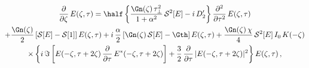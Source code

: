 \begin{multline} \label{eqn:mflt_ezt_pde}
    \frac{\partial}{\partial \zeta}\, E(\zeta, \tau) = \half \left\{ \frac{\Gn(\zeta)\, \tau_\perp^2}{1 + \alpha^2}\, \mathcal{S}^2[E] - i\, D_2^\prime \right\} \frac{\partial^2}{\partial \tau^2}\, E(\zeta, \tau) \\
    + \frac{\Gn(\zeta)}{2} \left[ \mathcal{S}[E] - \mathcal{S}[1]\right] E(\zeta, \tau)
    + i\, \frac{\alpha}{2} \left[ \Gn(\zeta)\, \mathcal{S}[E] - \Gth \right] E(\zeta, \tau) 
    + \frac{\Gn(\zeta)\, \chi}{4}\, \mathcal{S}^2[E]\, I_0\, K(-\zeta) \\
    \times \left\{ i\, \Im\left[E(-\zeta, \tau + 2 \zeta)\, \frac{\partial}{\partial \tau}\, E^\ast(-\zeta, \tau + 2 \zeta)\right] + \frac{3}{2}\, \frac{\partial}{\partial \tau}\, |E(-\zeta, \tau + 2 \zeta)|^2  \right\} E(\zeta, \tau)\, ,
\end{multline}
